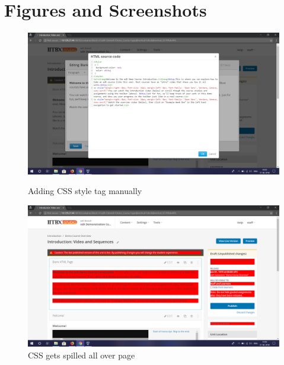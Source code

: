 \chapter{Figures and Screenshots}


\begin{figure}[ht]
  \centering
  \includegraphics[width=\textwidth]{images/issue_0}
  \caption{Adding CSS style tag manually}

  \vspace*{\floatsep}

  \includegraphics[width=\textwidth]{images/issue_1}
  \caption{CSS gets spilled all over page}
\end{figure}

